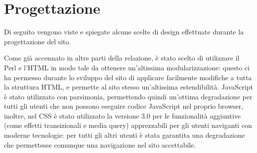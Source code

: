 \section{Progettazione}

Di seguito vengono viste e spiegate alcune scelte di design effettuate durante la progettazione del sito.


Come già accennato in altre parti della relazione, è stato scelto di utilizzare il Perl e l'HTML in modo tale da ottenere un'altissima modularizzazione: questo ci ha permesso durante lo sviluppo del sito di applicare facilmente modifiche a tutta la struttura HTML, e permette al sito stesso un'altissima estendibilità. JavaScript è stato utilizzato con parsimonia, permettendo quindi un'ottima degradazione per tutti gli utenti che non possono eseguire codice JavaScript nel proprio browser, inoltre, nel CSS è stato utilizzato la versione 3.0 per le funzionalità aggiuntive (come effetti transizionali e media query) apprezzabili per gli utenti naviganti con moderne tecnologie: per tutti gli altri utenti è stata garantita una degradazione che permettesse comunque una navigazione nel sito accettabile.
